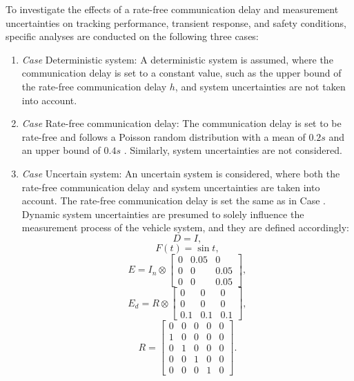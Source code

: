 \documentclass[a4paper]{cas-sc}
\begin{document}
To investigate the effects of a rate-free communication delay and measurement uncertainties on tracking performance, transient response, and safety conditions, specific analyses are conducted on the following three cases:
\begin{enumerate}
  \item \textit{Case \uppercase\expandafter{}} Deterministic system: A deterministic system is assumed, where the communication delay is set to a constant value, such as the upper bound of the rate-free communication delay $h$, and system uncertainties are not taken into account.
  \item \textit{Case \uppercase\expandafter{}} Rate-free communication delay: The communication delay is set to be rate-free and follows a Poisson random distribution with a mean of $0.2s$ and an upper bound of $0.4s$ \citep{ko1984delay,geng2008millimeter,consul1973generalization}. Similarly, system uncertainties are not considered.
  \item \textit{Case \uppercase\expandafter{}} Uncertain system: An uncertain system is considered, where both the rate-free communication delay and system uncertainties are taken into account. The rate-free communication delay is set the same as in Case \uppercase\expandafter{}. Dynamic system uncertainties are presumed to solely influence the measurement process of the vehicle system, and they are defined accordingly:
  \begin{equation*}
 D=I, 
  \end{equation*}
  \begin{equation*}
    F(t)=\sin t, 
     \end{equation*}
     \begin{equation*}
      E=I_n \otimes\left[\begin{array}{ccc}
        0 & 0.05 & 0 \\
        0 & 0 & 0.05 \\
        0 & 0 & 0.05
        \end{array}\right], 
       \end{equation*}
       \begin{equation*}
        E_{d}=R \otimes\left[\begin{array}{ccc}
          0 & 0 & 0 \\
          0 & 0 & 0 \\
          0.1 & 0.1 & 0.1
          \end{array}\right] ,
         \end{equation*}
         \begin{equation*}
          R=\left[\begin{array}{lllll}
            0 & 0 & 0 & 0 & 0 \\
            1 & 0 & 0 & 0 & 0 \\
            0 & 1 & 0 & 0 & 0 \\
            0 & 0 & 1 & 0 & 0 \\
            0 & 0 & 0 & 1 & 0
            \end{array}\right].
           \end{equation*}
  

\end{enumerate}
\end{document}
